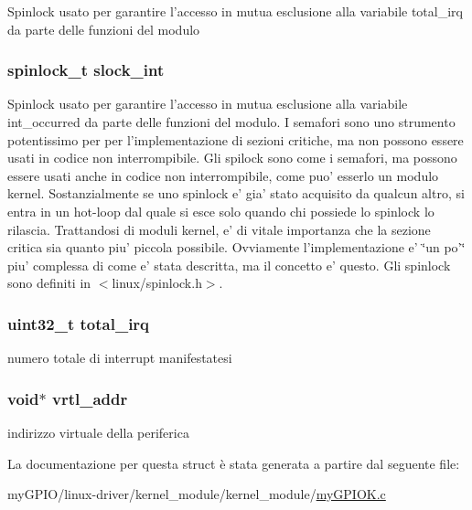 Spinlock usato per garantire l'accesso in mutua esclusione alla variabile total\+\_\+irq da parte delle funzioni del modulo \hypertarget{structmy_g_p_i_o_k__t_a1e1ddf972b4dc84dd331a0c72e5d9895}{
\subsubsection[{slock\+\_\+int}]{\setlength{\rightskip}{0pt plus 5cm}spinlock\+\_\+t slock\+\_\+int}}\label{structmy_g_p_i_o_k__t_a1e1ddf972b4dc84dd331a0c72e5d9895}
Spinlock usato per garantire l'accesso in mutua esclusione alla variabile int\+\_\+occurred da parte delle funzioni del modulo. I semafori sono uno strumento potentissimo per per l'implementazione di sezioni critiche, ma non possono essere usati in codice non interrompibile. Gli spilock sono come i semafori, ma possono essere usati anche in codice non interrompibile, come puo' esserlo un modulo kernel. Sostanzialmente se uno spinlock e' gia' stato acquisito da qualcun altro, si entra in un hot-\/loop dal quale si esce solo quando chi possiede lo spinlock lo rilascia. Trattandosi di moduli kernel, e' di vitale importanza che la sezione critica sia quanto piu' piccola possibile. Ovviamente l'implementazione e' \char`\"{}un
po'\char`\"{} piu' complessa di come e' stata descritta, ma il concetto e' questo. Gli spinlock sono definiti in $<$linux/spinlock.\+h$>$. \hypertarget{structmy_g_p_i_o_k__t_a2da711ac290a9613b8d8af97f122b997}{
\subsubsection[{total\+\_\+irq}]{\setlength{\rightskip}{0pt plus 5cm}uint32\+\_\+t total\+\_\+irq}}\label{structmy_g_p_i_o_k__t_a2da711ac290a9613b8d8af97f122b997}
numero totale di interrupt manifestatesi \hypertarget{structmy_g_p_i_o_k__t_af5aef493b3c2bc9d1f036ce0acea9bba}{
\subsubsection[{vrtl\+\_\+addr}]{\setlength{\rightskip}{0pt plus 5cm}void$\ast$ vrtl\+\_\+addr}}\label{structmy_g_p_i_o_k__t_af5aef493b3c2bc9d1f036ce0acea9bba}
indirizzo virtuale della periferica 

La documentazione per questa struct è stata generata a partire dal seguente file\+:\begin{DoxyCompactItemize}
\item 
my\+G\+P\+I\+O/linux-\/driver/kernel\+\_\+module/kernel\+\_\+module/\hyperlink{my_g_p_i_o_k_8c}{my\+G\+P\+I\+O\+K.\+c}\end{DoxyCompactItemize}

